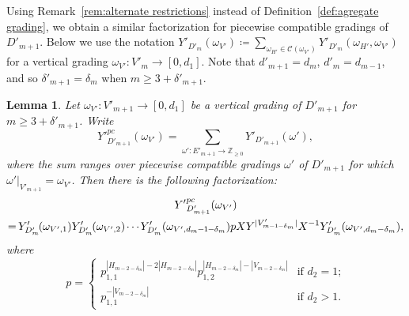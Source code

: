 \documentclass[10pt]{amsart}
\newtheorem{lemma}[theorem]{Lemma}
\theoremstyle{definition}
\newcommand{\cC}{\mathcal{C}}
\newcommand{\ZZ}{\mathbb{Z}}
\newcommand*{\mk}{\mkern -1mu}
\newcommand*{\Mk}{\mkern -2mu}
\begin{document}
Using Remark~\ref{rem:alternate restrictions} instead of Definition~\ref{def:agregate grading}, we obtain a similar factorization for piecewise compatible gradings of $D'_{m+1}$.
Below we use the notation $Y'_{D'_m}(\omega_{V'})\coloneqq \sum_{\omega_{H'}\in\cC(\omega_{V'})}Y'_{D'_m}(\omega_{H'},\omega_{V'})$ for a vertical grading $\omega_{V'}:V'_m\to[0,d_1]$.
Note that $d'_{m+1}=d_m$, $d'_m=d_{m-1}$, and so $\delta'_{m+1}=\delta_m$ when $m\ge3+\delta'_{m+1}$.
\begin{lemma}
 \label{le:piecewise compatible factorization 2}
 Let $\omega_{V'}:V'_{m+1}\to[0,d_1]$ be a vertical grading of $D'_{m+1}$ for $m\ge3+\delta'_{m+1}$.
 Write 
 \[{Y'}_{D'_{m+1}}^{pc}(\omega_{V'})=\sum\limits_{\omega':E'_{m+1}\to\ZZ_{\ge0}} Y'_{D'_{m+1}}(\omega'),\]
 where the sum ranges over piecewise compatible gradings $\omega'$ of $D'_{m+1}$ for which $\omega'|_{V'_{m+1}}=\omega_{V'}$.
 Then there is the following factorization:
 \begin{multline}
 \label{eq:piecewise compatible factorization 2}
 {Y'}_{D'_{m+1}}^{pc}(\omega_{V'})\\
 =\Mk Y'_{D'_m}\Mk (\omega_{V',1})Y'_{D'_m}\Mk (\omega_{V',2})\mk \cdots \mk Y'_{D'_m}(\omega_{V',d_m\mk -\mk 1\mk -\mk \delta_m})pXY^{|V'_{m\mk -\mk 1\mk -\mk \delta_m}|}X^{-1} Y'_{D'_m}(\omega_{V',d_m-\delta_m}),
 \end{multline}
 where 
 \[p=\begin{cases} p_{1,1}^{|H_{m-2-\delta_m}|-2|H_{m-2-\delta_m}|}p_{1,2}^{|H_{m-2-\delta_m}|-|V_{m-2-\delta_m}|} & \text{if $d_2=1$;}\\ p_{1,1}^{-|V_{m-2-\delta_m}|} & \text{if $d_2>1$.}\end{cases}\]
\end{lemma}
\end{document}
